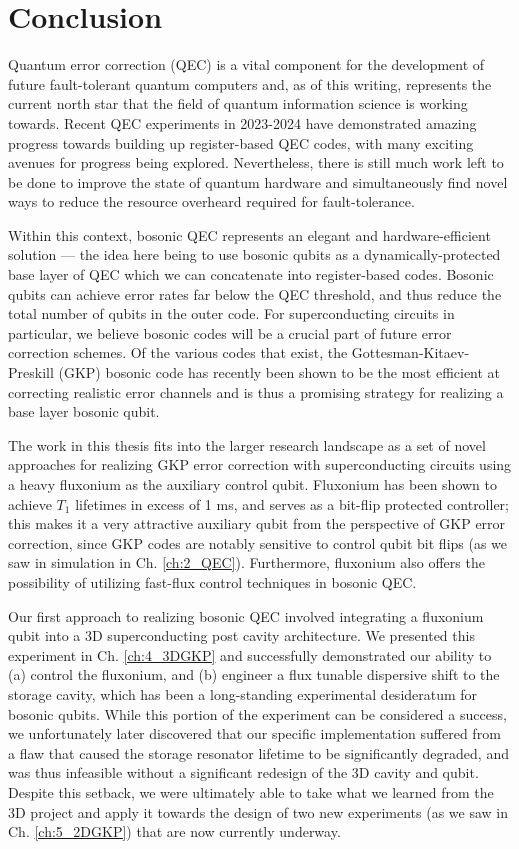 \chapter{Conclusion\label{ch:6_Conclusion}}

Quantum error correction (QEC) is a vital component for the development of future fault-tolerant quantum computers and, as of this writing, represents the current north star that the field of quantum information science is working towards. Recent QEC experiments in 2023-2024 have demonstrated amazing progress towards building up register-based QEC codes, with many exciting avenues for progress being explored. Nevertheless, there is still much work left to be done to improve the state of quantum hardware and simultaneously find novel ways to reduce the resource overheard required for fault-tolerance. 

Within this context, bosonic QEC represents an elegant and hardware-efficient solution --- the idea here being to use bosonic qubits as a dynamically-protected base layer of QEC which we can concatenate into register-based codes. Bosonic qubits can achieve error rates far below the QEC threshold, and thus reduce the total number of qubits in the outer code. For superconducting circuits in particular, we believe bosonic codes will be a crucial part of future error correction schemes. Of the various codes that exist, the Gottesman-Kitaev-Preskill (GKP) bosonic code has recently been shown to be the most efficient at correcting realistic error channels and is thus a promising strategy for realizing a base layer bosonic qubit.  

The work in this thesis fits into the larger research landscape as a set of novel approaches for realizing GKP error correction with superconducting circuits using a heavy fluxonium as the auxiliary control qubit. Fluxonium has been shown to achieve $T_1$ lifetimes in excess of 1 ms, and serves as a bit-flip protected controller; this makes it a very attractive auxiliary qubit from the perspective of GKP error correction, since GKP codes are notably sensitive to control qubit bit flips (as we saw in simulation in Ch. \ref{ch:2_QEC}). Furthermore, fluxonium also offers the possibility of utilizing fast-flux control techniques in bosonic QEC. 

Our first approach to realizing bosonic QEC involved integrating a fluxonium qubit into a 3D superconducting post cavity architecture. We presented this experiment in Ch. \ref{ch:4_3DGKP} and successfully demonstrated our ability to (a) control the fluxonium, and (b) engineer a flux tunable dispersive shift to the storage cavity, which has been a long-standing experimental desideratum for bosonic qubits. While this portion of the experiment can be considered a success, we unfortunately later discovered that our specific implementation suffered from a flaw that caused the storage resonator lifetime to be significantly degraded, and was thus infeasible without a significant redesign of the 3D cavity and qubit. Despite this setback, we were ultimately able to take what we learned from the 3D project and apply it towards the design of two new experiments (as we saw in Ch. \ref{ch:5_2DGKP}) that are now currently underway. 

